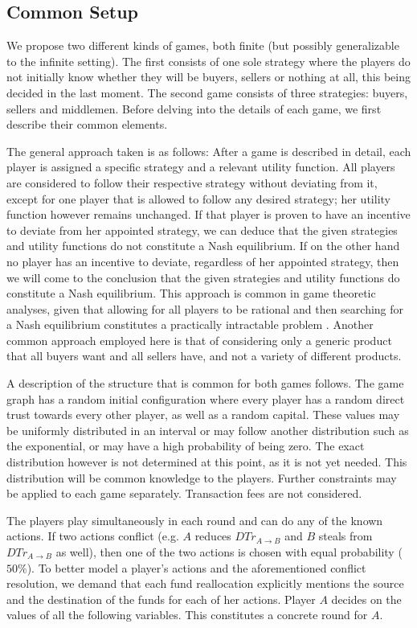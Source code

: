 \subsection{Common Setup}
  We propose two different kinds of games, both finite (but possibly generalizable to the infinite setting). The first
  consists of one sole strategy where the players do not initially know whether they will be buyers, sellers or nothing at
  all, this being decided in the last moment. The second game consists of three strategies: buyers, sellers and middlemen.
  Before delving into the details of each game, we first describe their common elements.
  
  The general approach taken is as follows: After a game is described in detail, each player is assigned a specific strategy and
  a relevant utility function. All players are considered to follow their respective strategy without deviating from it, except
  for one player that is allowed to follow any desired strategy; her utility function however remains unchanged. If that player
  is proven to have an incentive to deviate from her appointed strategy, we can deduce that the given strategies and utility
  functions do not constitute a Nash equilibrium. If on the other hand no player has an incentive to deviate, regardless of
  her appointed strategy, then we will come to the conclusion that the given strategies and utility functions do constitute a
  Nash equilibrium. This approach is common in game theoretic analyses, given that allowing for all players to be rational and
  then searching for a Nash equilibrium constitutes a practically intractable problem \cite{daskalakis}. Another common
  approach employed here is that of considering only a generic product that all buyers want and all sellers have, and not a
  variety of different products.

  A description of the structure that is common for both games follows. The game graph has a random initial configuration
  where every player has a random direct trust towards every other player, as well as a random capital. These values may be
  uniformly distributed in an interval or may follow another distribution such as the exponential, or may have a high
  probability of being zero. The exact distribution however is not determined at this point, as it is not yet needed. This
  distribution will be common knowledge to the players. Further constraints may be applied to each game separately.
  Transaction fees are not considered.
  
  The players play simultaneously in each round and can do any of the known actions. If two actions conflict (e.g. $A$ reduces
  $DTr_{A \rightarrow B}$ and $B$ steals from $DTr_{A \rightarrow B}$ as well), then one of the two actions is chosen with
  equal probability ($50\%$). To better model a player's actions and the aforementioned conflict resolution, we demand that
  each fund reallocation explicitly mentions the source and the destination of the funds for each of her actions. Player $A$
  decides on the values of all the following variables. This constitutes a concrete round for $A$.
  

